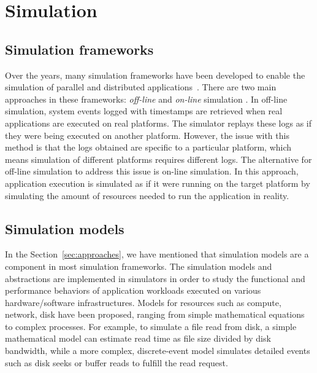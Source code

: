 \section{Simulation}

\subsection{Simulation frameworks}

Over the years, many simulation frameworks have been developed to enable 
the simulation of parallel and distributed 
applications~\cite{optorsim, gridsim, groudsim, cloudsim,
nunez2012simcan,nunez2012icancloud, mdcsim, dissect_cf,
cloudnetsimplusplus, fognetsimplusplus, casanova2014simgrid,
ROSS, casanova2020fgcs}. 
There are two main approaches in these frameworks: \textit{off-line} and 
\textit{on-line} simulation \cite{casanova2014simgrid}. 
In off-line simulation, system events logged with timestamps are retrieved 
when real applications are executed on real platforms.
The simulator replays these logs as if they were being executed 
on another platform. 
However, the issue with this method is that the logs obtained are specific to 
a particular platform, which means simulation of different platforms 
requires different logs.
The alternative for off-line simulation to address this issue is 
on-line simulation.
In this approach, application execution is simulated as if it were running 
on the target platform by simulating the amount of resources needed 
to run the application in reality. 

\subsection{Simulation models}
\label{sec:simmodel}

In the Section~\ref{sec:approaches}, we have mentioned that simulation models are 
a component in most simulation frameworks.
The simulation models and abstractions are implemented in simulators 
in order to study the functional and performance behaviors of application 
workloads executed on various hardware/software infrastructures. 
Models for resources such as compute, network, disk have been proposed, 
ranging from simple mathematical equations  
to complex processes.
For example, to simulate a file read from disk, a simple mathematical model 
can estimate read time as file size divided by disk bandwidth, 
while a more complex, discrete-event model simulates detailed events 
such as disk seeks or buffer reads to fulfill the read request.

